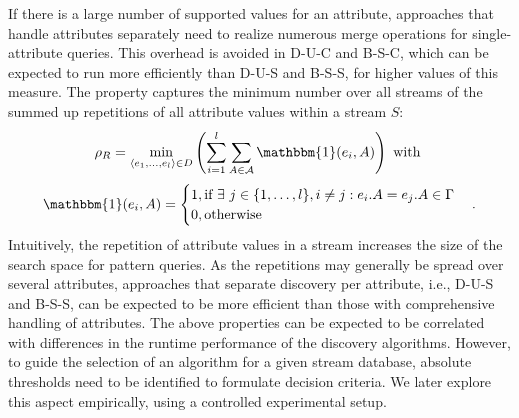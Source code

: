 \normalsize
\noindent
If there is a large number of supported values for an attribute, approaches
that handle attributes separately need to realize numerous merge
operations for single-attribute queries. This overhead is avoided in D-U-C
and B-S-C, which can be expected to run more efficiently than
D-U-S and B-S-S, for higher values of this measure.
 The property
captures the minimum
number over all streams of the summed
up repetitions of all attribute values within a stream $S$:
\vspace{-1em}
\small
$$\rho_R = \min_{\langle e_1, \ldots, e_l\rangle \in
	D}\left(\sum_{i=1}^{l} \sum_{A\in
	\mathcal{A}}\mathbbm{1}(e_i,A)\right) \text{ with
	}
$$
\vspace{-.5em}
$$
	\mathbbm{1}(e_i,A)=\begin{cases}
	1, \text{if }  \exists \ j \in \{1,\ldots, l\}, i\neq j: e_i.A=e_j.A \in
	\Gamma\\
	0,   \text{otherwise}
\end{cases}.$$
\normalsize
\noindent
Intuitively, the repetition of attribute values in a stream increases the
size of the search space for pattern queries. As the repetitions may
generally be spread over several attributes, approaches that separate
discovery per attribute, i.e., D-U-S and B-S-S, can be expected to be more
efficient than those with comprehensive handling of attributes.
The above properties can be expected to be correlated with differences in
the runtime performance of the discovery algorithms. However, to guide the
selection of an algorithm for a given stream database, absolute thresholds
need to be identified to formulate decision criteria. We later explore this
aspect empirically, using a controlled experimental setup.
